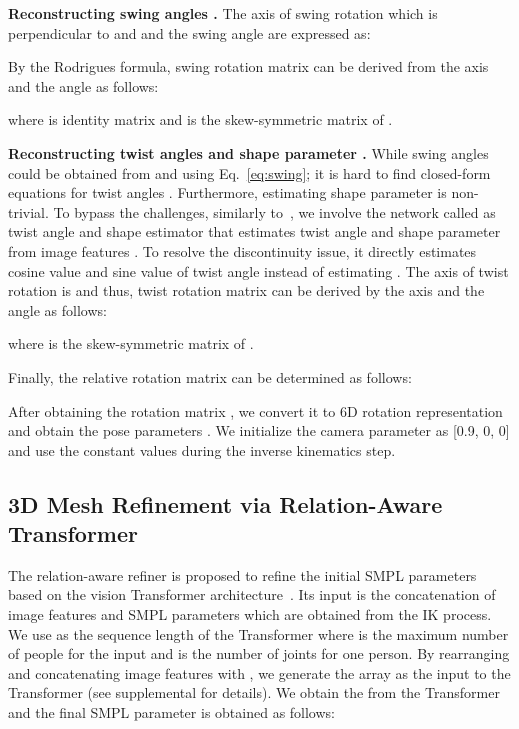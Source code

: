 \documentclass[runningheads]{llncs}
\begin{document}
\noindent \textbf{Reconstructing swing angles .} The axis of swing rotation  which is perpendicular to  and  and the swing angle  are expressed as:

By the Rodrigues formula, swing rotation matrix  can be derived from the axis  and the angle  as follows:

where  is  identity matrix and  is the skew-symmetric matrix of . 

\noindent \textbf{Reconstructing twist angles  and shape parameter .} While swing angles  could be obtained from  and  using Eq.~\ref{eq:swing}; it is hard to find closed-form equations for twist angles . Furthermore, estimating shape parameter  is non-trivial. To bypass the challenges, similarly to~\cite{li2021hybrik}, we involve the network called as twist angle and shape estimator  that estimates twist angle  and shape parameter  from image features . To resolve the discontinuity issue, it directly estimates cosine value  and sine value  of twist angle instead of estimating . The axis of twist rotation is  and thus, twist rotation matrix  can be derived by the axis  and the angle  as follows:

where  is the skew-symmetric matrix of . 

Finally, the relative rotation matrix  can be determined as follows:

After obtaining the rotation matrix , we convert it to 6D rotation representation and obtain the pose parameters . We initialize the camera parameter  as [0.9, 0, 0] and use the constant values during the inverse kinematics step.

\subsection{3D Mesh Refinement via Relation-Aware Transformer}
\label{method:Refinement}

The relation-aware refiner  is proposed to refine the initial SMPL parameters based on the vision Transformer architecture~\cite{dosovitskiy2020image}. Its input is the concatenation of image features  and SMPL parameters  which are obtained from the IK process. We use  as the sequence length of the Transformer where  is the maximum number of people for the input and  is the number of joints for one person. By rearranging and concatenating image features  with , we generate the  array as the input to the Transformer (see supplemental for details). We obtain the  from the Transformer and the final SMPL parameter is obtained as follows:
\end{document}
